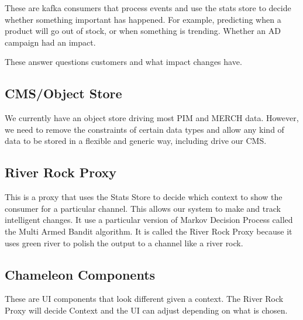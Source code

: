 \documentclass[11pt]{article}
\begin{document}
These are kafka consumers that process events and use the stats store to decide
whether something important has happened. For example, predicting when a product
will go out of stock, or when something is trending. Whether an AD campaign had
an impact.

These answer questions customers and what impact changes have.

\subsection{CMS/Object Store}

We currently have an object store driving most PIM and MERCH data. However, we
need to remove the constraints of certain data types and allow any kind of data to be stored in a
flexible and generic way, including drive our CMS.

\subsection{River Rock Proxy}

This is a proxy that uses the Stats Store to decide
which context to show the consumer for a particular channel. 
This allows our system to make and track intelligent changes. 
It use a particular version of Markov Decision Process called the Multi Armed 
Bandit algorithm. It is called the River Rock Proxy because it uses green river to polish
the output to a channel like a river rock. 

\subsection{Chameleon Components}

These are UI components that look different given a context. The River Rock Proxy 
will decide Context and the UI can adjust depending on what is chosen. 
\end{document}
